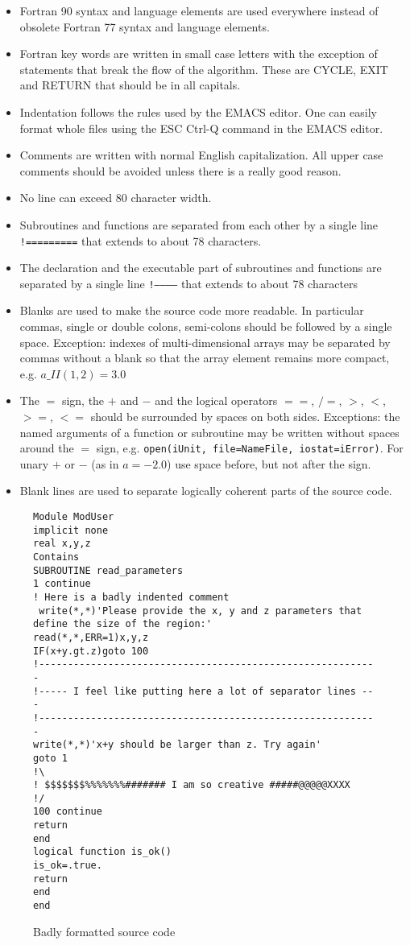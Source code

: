 \documentclass{article}
\begin{document}
\begin{itemize}
\item Fortran 90 syntax and language elements are used everywhere instead 
      of obsolete Fortran 77 syntax and language elements.
\item Fortran key words are written in small case letters with the 
      exception of statements that break the flow of the algorithm.
      These are CYCLE, EXIT and RETURN that should be in all capitals.
\item Indentation follows the rules used by the EMACS editor. One can
      easily format whole files using the ESC Ctrl-Q command in the
      EMACS editor.
\item Comments are written with normal English capitalization. All upper
      case comments should be avoided unless there is a really good reason.
\item No line can exceed 80 character width. 
\item Subroutines and functions are separated from each other 
      by a single line {\tt !=========} that extends to about 78 characters.
\item The declaration and the executable part of subroutines and functions
      are separated by a single line {\tt !------------} that extends to 
      about 78 characters
\item Blanks are used to make the source code more readable. In particular
      commas, single or double colons, semi-colons should be followed
      by a single space. Exception: indexes of multi-dimensional arrays
      may be separated by commas without a blank so that the array
      element remains more compact, e.g. $a\_II(1,2) = 3.0$
\item The $=$ sign, the $+$ and $-$ and the logical operators
      $==$, $/=$, $>$, $<$, $>=$, $<=$ should be surrounded
      by spaces on both sides. Exceptions: the named arguments of a function
      or subroutine may be written without spaces around the $=$ sign, e.g.
      {\tt open(iUnit, file=NameFile, iostat=iError)}.
      For unary $+$ or $-$ (as in $a = -2.0$) use 
      space before, but not after the sign.
\item Blank lines are used to separate logically coherent parts of the 
      source code.
\end{itemize}

\begin{figure}
\begin{verbatim}
Module ModUser
implicit none
real x,y,z
Contains
SUBROUTINE read_parameters 
1 continue
! Here is a badly indented comment
 write(*,*)'Please provide the x, y and z parameters that define the size of the region:'
read(*,*,ERR=1)x,y,z
IF(x+y.gt.z)goto 100
!-----------------------------------------------------------
!----- I feel like putting here a lot of separator lines ---
!-----------------------------------------------------------
write(*,*)'x+y should be larger than z. Try again'
goto 1
!\
! $$$$$$$%%%%%%%####### I am so creative #####@@@@@XXXX
!/
100 continue
return
end
logical function is_ok()
is_ok=.true.
return
end
end
\end{verbatim}
\caption{Badly formatted source code}
\label{fig:badformat}
\end{figure}
\end{document}

